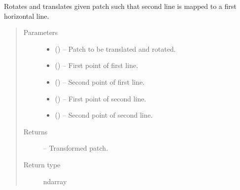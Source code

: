 \documentclass[letterpaper,10pt,english]{sphinxmanual}
\begin{document}
\begin{fulllineitems}
\label{\detokenize{image_lines:image_lines.get_transformed_patch}}
Rotates and translates given patch such that second line is mapped to a
first horizontal line.
\begin{quote}\begin{description}
\item[{Parameters}] \leavevmode\begin{itemize}
\item {} 
 () -- Patch to be translated and rotated.

\item {} 
 () -- First point of first line.

\item {} 
 () -- Second point of first line.

\item {} 
 () -- First point of second line.

\item {} 
 () -- Second point of second line.

\end{itemize}

\item[{Returns}] \leavevmode
{} -- Transformed patch.

\item[{Return type}] \leavevmode
ndarray

\end{description}\end{quote}

\end{fulllineitems}

\end{document}
